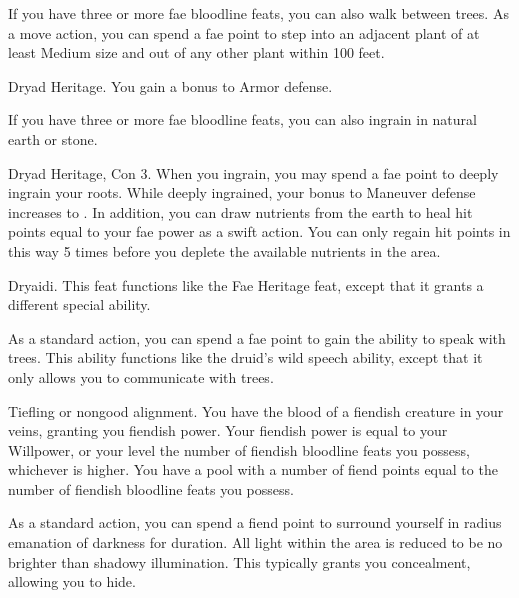 If you have three or more fae bloodline feats, you can also walk between trees. As a move action, you can spend a fae point to step into an adjacent plant of at least Medium size and out of any other plant within 100 feet.

\featpre Dryad Heritage.
\featben You gain a  bonus to Armor defense.

If you have three or more fae bloodline feats, you can also ingrain in natural earth or stone.

\featpres Dryad Heritage, Con 3.
\featben When you ingrain, you may spend a fae point to deeply ingrain your roots. While deeply ingrained, your bonus to Maneuver defense increases to . In addition, you can draw nutrients from the earth to heal hit points equal to your fae power as a swift action. You can only regain hit points in this way 5 times before you deplete the available nutrients in the area. 

\featpre Dryaidi.
\featben This feat functions like the Fae Heritage feat, except that it grants a different special ability.

As a standard action, you can spend a fae point to gain the ability to speak with trees. This ability functions like the druid's wild speech ability, except that it only allows you to communicate with trees.

\featpre Tiefling or nongood alignment.
\featben You have the blood of a fiendish creature in your veins, granting you fiendish power.
Your fiendish power is equal to your Willpower, or your level \add the number of fiendish bloodline feats you possess, whichever is higher.
You have a pool with a number of fiend points equal to the number of fiendish bloodline feats you possess.

As a standard action, you can spend a fiend point to surround yourself in \areamed radius emanation of darkness for \durshort duration.
All light within the area is reduced to be no brighter than shadowy illumination.
This typically grants you concealment, allowing you to hide.
